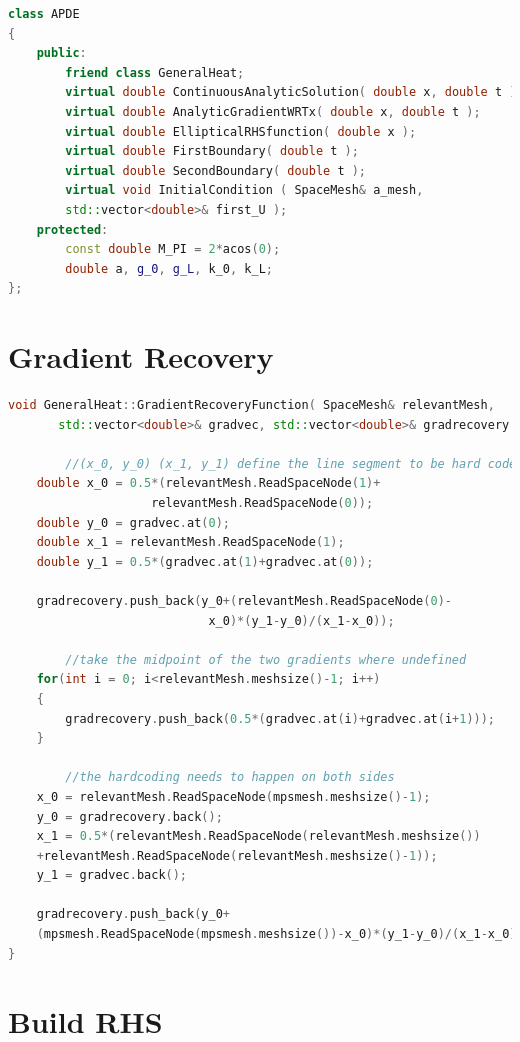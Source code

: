 \documentclass{uonmathreport}
\theoremstyle{definition}
\theoremstyle{problem}
\theoremstyle{theorem}
\begin{document}
\begin{lstlisting}[language=C++]
class APDE
{
    public:
        friend class GeneralHeat;
        virtual double ContinuousAnalyticSolution( double x, double t );
        virtual double AnalyticGradientWRTx( double x, double t );
        virtual double EllipticalRHSfunction( double x );
        virtual double FirstBoundary( double t );
        virtual double SecondBoundary( double t );
        virtual void InitialCondition ( SpaceMesh& a_mesh, 
        std::vector<double>& first_U );
    protected:
        const double M_PI = 2*acos(0);
        double a, g_0, g_L, k_0, k_L;
};
\end{lstlisting}

\section{Gradient Recovery} \label{app:Gradient Recovery}

\begin{lstlisting}[language=C++]
void GeneralHeat::GradientRecoveryFunction( SpaceMesh& relevantMesh,
       std::vector<double>& gradvec, std::vector<double>& gradrecovery ) {
    	
    	//(x_0, y_0) (x_1, y_1) define the line segment to be hard coded
    double x_0 = 0.5*(relevantMesh.ReadSpaceNode(1)+
    				relevantMesh.ReadSpaceNode(0));
    double y_0 = gradvec.at(0);
    double x_1 = relevantMesh.ReadSpaceNode(1);
    double y_1 = 0.5*(gradvec.at(1)+gradvec.at(0));

    gradrecovery.push_back(y_0+(relevantMesh.ReadSpaceNode(0)-
    						x_0)*(y_1-y_0)/(x_1-x_0));
		
		//take the midpoint of the two gradients where undefined
    for(int i = 0; i<relevantMesh.meshsize()-1; i++)
    {
        gradrecovery.push_back(0.5*(gradvec.at(i)+gradvec.at(i+1)));
    }
		
		//the hardcoding needs to happen on both sides
    x_0 = relevantMesh.ReadSpaceNode(mpsmesh.meshsize()-1);
    y_0 = gradrecovery.back();
    x_1 = 0.5*(relevantMesh.ReadSpaceNode(relevantMesh.meshsize())			   
    +relevantMesh.ReadSpaceNode(relevantMesh.meshsize()-1));
    y_1 = gradvec.back();

    gradrecovery.push_back(y_0+
    (mpsmesh.ReadSpaceNode(mpsmesh.meshsize())-x_0)*(y_1-y_0)/(x_1-x_0));
}
\end{lstlisting}

\section{Build RHS} \label{app:RHS}
\end{document}
